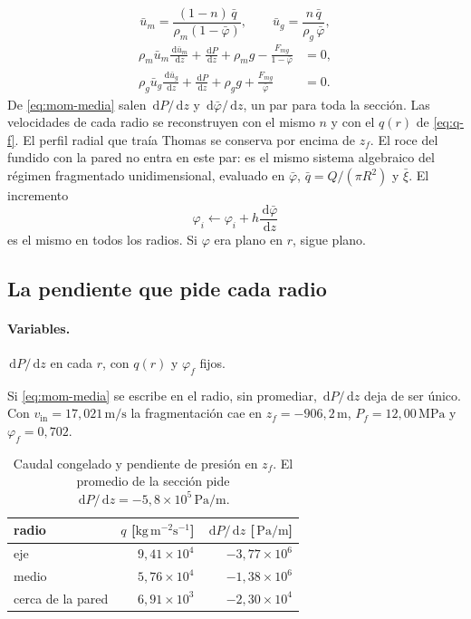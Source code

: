 \documentclass[11pt,a4paper]{article}
\newcommand{\dd}{\,\mathrm{d}}
\newcommand{\vin}{v_{\mathrm{in}}}
\newcommand{\MPa}{\ensuremath{\,\mathrm{MPa}}}
\newcommand{\ms}{\ensuremath{\,\mathrm{m/s}}}
\newcommand{\Pam}{\ensuremath{\,\mathrm{Pa/m}}}
\begin{document}
\begin{equation}
\label{eq:umedias}
\bar u_m=\frac{(1-n)\,\bar q}{\rho_m(1-\bar\varphi)},
\qquad
\bar u_g=\frac{n\,\bar q}{\rho_g\,\bar\varphi},
\end{equation}
\begin{align}
\label{eq:mom-media}
\rho_m\bar u_m\frac{\dd\bar u_m}{\dd z}
+\frac{\dd P}{\dd z}+\rho_m g
-\frac{F_{mg}}{1-\bar\varphi}
&=0,
\\
\rho_g\bar u_g\frac{\dd\bar u_g}{\dd z}
+\frac{\dd P}{\dd z}+\rho_g g
+\frac{F_{mg}}{\bar\varphi}
&=0.
\end{align}
De \eqref{eq:mom-media} salen $\dd P/\dd z$ y $\dd\bar\varphi/\dd z$,
un par para toda la sección. Las velocidades de cada radio se
reconstruyen con el mismo $n$ y con el $q(r)$ de \eqref{eq:q-f}.
El perfil radial que traía Thomas se conserva por encima de $z_f$.
El roce del fundido con la pared no entra en este par: es el mismo
sistema algebraico del régimen fragmentado unidimensional, evaluado
en $\bar\varphi$, $\bar q=Q/(\pi R^2)$ y $\bar\xi$. El incremento
\begin{equation}
\label{eq:dphi}
\varphi_i\leftarrow\varphi_i+h\frac{\dd\bar\varphi}{\dd z}
\end{equation}
es el mismo en todos los radios. Si $\varphi$ era plano en $r$,
sigue plano.

\subsection{La pendiente que pide cada radio}

\paragraph{Variables.}
$\dd P/\dd z$ en cada $r$, con $q(r)$ y $\varphi_f$ fijos.

Si \eqref{eq:mom-media} se escribe en el radio, sin promediar,
$\dd P/\dd z$ deja de ser único. Con $\vin=17{,}021\ms$ la
fragmentación cae en $z_f=-906{,}2\,\mathrm{m}$,
$P_f=12{,}00\MPa$ y $\varphi_f=0{,}702$.

\begin{table}[ht]
\centering
\caption{Caudal congelado y pendiente de presión en $z_f$.
El promedio de la sección pide
$\dd P/\dd z=-5{,}8\times 10^{5}\Pam$.}
\label{tab:dpdz-r}
\begin{tabular}{@{}lrr@{}}
\toprule
radio & $q$ [$\mathrm{kg\,m^{-2}s^{-1}}$]
& $\dd P/\dd z$ [\Pam] \\
\midrule
eje & $9{,}41\times 10^{4}$ & $-3{,}77\times 10^{6}$ \\
medio & $5{,}76\times 10^{4}$ & $-1{,}38\times 10^{6}$ \\
cerca de la pared & $6{,}91\times 10^{3}$ & $-2{,}30\times 10^{4}$ \\
\bottomrule
\end{tabular}
\end{table}
\end{document}
